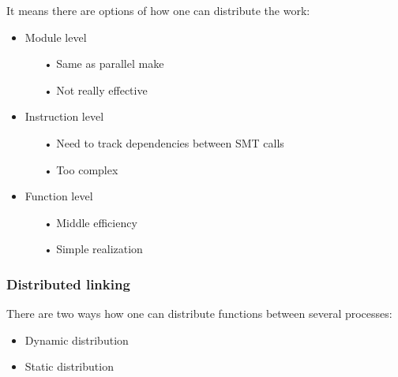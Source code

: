 \begin{frame}

It means there are options of how one can distribute the work:
\begin{itemize}
	\item Module level
	\begin{itemize}
	    \item[•] Same as parallel make
	    \item[•] Not really effective
	\end{itemize}
	\item Instruction level
		\begin{itemize}
	        \item[•] Need to track dependencies between SMT calls
	        \item[•] Too complex
		\end{itemize}
	\item Function level
	    \begin{itemize}
	        \item[•] Middle efficiency
	        \item[•] Simple realization
	    \end{itemize}
\end{itemize}
\end{frame}

\begin{frame}
\frametitle{Distributed linking}
There are two ways how one can distribute functions between several processes:
	\begin{itemize}
		\item Dynamic distribution
		\item Static distribution
	\end{itemize}
\end{frame}


